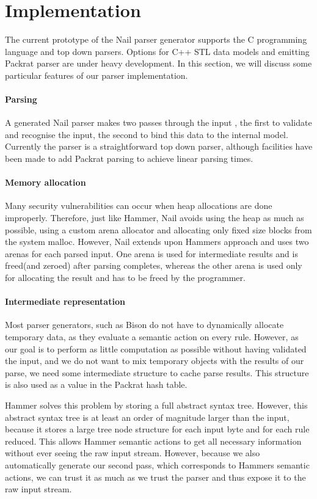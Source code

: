\section{Implementation}
The current prototype of the Nail parser generator supports the C programming language and top down parsers. Options for C++ STL data models and emitting Packrat parser
\cite{packrat-parsing:icfp02} are under heavy development. In this section, we will discuss some particular
features of our parser implementation.

\paragraph{Parsing}
A generated Nail parser makes two passes through the input , the first to validate and recognise the
input, the second to bind this data to the internal model. Currently the parser is a straightforward
top down parser, although facilities have been made to add Packrat parsing to achieve linear parsing times.
\paragraph{Memory allocation} 
Many security vulnerabilities can occur when heap allocations are done improperly. Therefore, just
like Hammer, Nail avoids using the heap as much as possible, using a custom arena allocator and
allocating only fixed size blocks from the system malloc. However, Nail extends upon Hammers
approach and uses two arenas for each parsed input. One arena is used for intermediate results and is
freed(and zeroed) after parsing completes, whereas the other arena is used only for allocating the
result and has to be freed by the programmer. 

\paragraph{Intermediate representation}
Most parser generators, such as Bison do not have to dynamically allocate temporary
data, as they evaluate a semantic action on every rule. However, as our goal is to perform as little
computation as possible without having validated the input, and we do not want to mix temporary
objects with the results of our parse, we need some intermediate structure to cache parse results.
This structure is also used as a value in the Packrat hash table. 

Hammer solves this problem by storing a full abstract syntax tree. However, this abstract syntax
tree is at least an order of magnitude larger than the input, because it stores a large tree node
structure for each input byte and for each rule reduced. This allows Hammer semantic actions to get
all necessary information without ever seeing the raw input stream. However, because we also
automatically generate our second pass, which corresponds to Hammers semantic actions, we can trust
it as much as we trust the parser and thus expose it to the raw input stream. 

